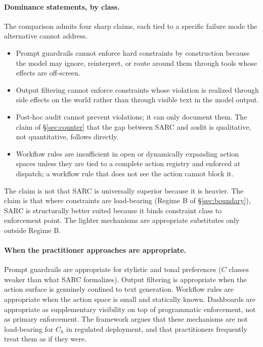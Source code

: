 \documentclass[11pt,a4paper]{article}
\theoremstyle{remark}
\begin{document}
\paragraph{Dominance statements, by class.} The comparison admits four sharp claims, each tied to a specific failure mode the alternative cannot address.

\begin{itemize}[leftmargin=2em,topsep=0.3em,itemsep=0.3em]
\item Prompt guardrails cannot enforce hard constraints by construction because the model may ignore, reinterpret, or route around them through tools whose effects are off-screen.
\item Output filtering cannot enforce constraints whose violation is realized through side effects on the world rather than through visible text in the model output.
\item Post-hoc audit cannot prevent violations; it can only document them. The claim of \S\ref{sec:counter} that the gap between SARC and audit is qualitative, not quantitative, follows directly.
\item Workflow rules are insufficient in open or dynamically expanding action spaces unless they are tied to a complete action registry and enforced at dispatch; a workflow rule that does not see the action cannot block it.
\end{itemize}

The claim is not that SARC is universally superior because it is heavier. The claim is that where constraints are load-bearing (Regime B of \S\ref{sec:boundary}), SARC is structurally better suited because it binds constraint class to enforcement point. The lighter mechanisms are appropriate substitutes only outside Regime B.

\paragraph{When the practitioner approaches are appropriate.} Prompt guardrails are appropriate for stylistic and tonal preferences ($C$ classes weaker than what SARC formalizes). Output filtering is appropriate when the action surface is genuinely confined to text generation. Workflow rules are appropriate when the action space is small and statically known. Dashboards are appropriate as supplementary visibility on top of programmatic enforcement, not as primary enforcement. The framework argues that these mechanisms are not load-bearing for $C_h$ in regulated deployment, and that practitioners frequently treat them as if they were.
\end{document}

